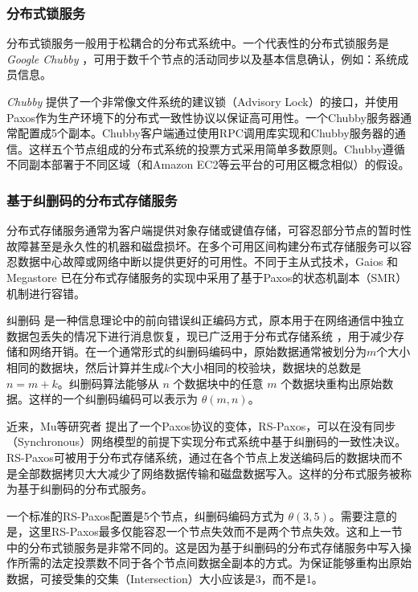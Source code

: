 \subsubsection{分布式锁服务}
\label{subsection-case-dls}
分布式锁服务一般用于松耦合的分布式系统中。一个代表性的分布式锁服务是 \emph{Google Chubby} \cite{Burrows:2006:CLS:1298455.1298487}，可用于数千个节点的活动同步以及基本信息确认，例如：系统成员信息。

\emph{Chubby} 提供了一个非常像文件系统的建议锁（Advisory Lock）的接口，并使用Paxos作为生产环境下的分布式一致性协议以保证高可用性。一个Chubby服务器通常配置成5个副本。Chubby客户端通过使用RPC调用库实现和Chubby服务器的通信。这样五个节点组成的分布式系统的投票方式采用简单多数原则。Chubby遵循不同副本部署于不同区域（和Amazon EC2等云平台的可用区概念相似）的假设。

\subsubsection{基于纠删码的分布式存储服务}
\label{subsubsec:dss}
分布式存储服务通常为客户端提供对象存储或键值存储，可容忍部分节点的暂时性故障甚至是永久性的机器和磁盘损坏。在多个可用区间构建分布式存储服务可以容忍数据中心故障或网络中断以提供更好的可用性。不同于主从式技术，Gaios \cite{Bolosky:2011:PRS:1972457.1972472} 和 Megastore \cite{baker2011megastore} 已在分布式存储服务的实现中采用了基于Paxos的状态机副本（SMR）机制进行容错。

纠删码 \cite{Rizzo:1997:EEC:263876.263881} 是一种信息理论中的前向错误纠正编码方式，原本用于在网络通信中独立数据包丢失的情况下进行消息恢复，现已广泛用于分布式存储系统 \cite{Huang:2012:ECW:2342821.2342823, Sathiamoorthy:2013:XEN:2488335.2488339}，用于减少存储和网络开销。在一个通常形式的纠删码编码中，原始数据通常被划分为$m$个大小相同的数据块，然后计算并生成$k$个大小相同的校验块，数据块的总数是 $n = m + k$。纠删码算法能够从 $n$ 个数据块中的任意 $m$ 个数据块重构出原始数据。这样的一个纠删码编码可以表示为 $\theta (m,n )$。

近来，Mu等研究者 \cite{Mu:2014:PME:2600212.2600218} 提出了一个Paxos协议的变体，RS-Paxos，可以在没有同步（Synchronous）网络模型的前提下实现分布式系统中基于纠删码的一致性决议。RS-Paxos可被用于分布式存储系统，通过在各个节点上发送编码后的数据块而不是全部数据拷贝大大减少了网络数据传输和磁盘数据写入。这样的分布式服务被称为基于纠删码的分布式服务。

一个标准的RS-Paxos配置是5个节点，纠删码编码方式为 $\theta(3, 5)$。需要注意的是，这里RS-Paxos最多仅能容忍一个节点失效而不是两个节点失效。这和上一节中的分布式锁服务是非常不同的。这是因为基于纠删码的分布式存储服务中写入操作所需的法定投票数不同于各个节点间数据全副本的方式。为保证能够重构出原始数据，可接受集的交集（Intersection）大小应该是3，而不是1。

